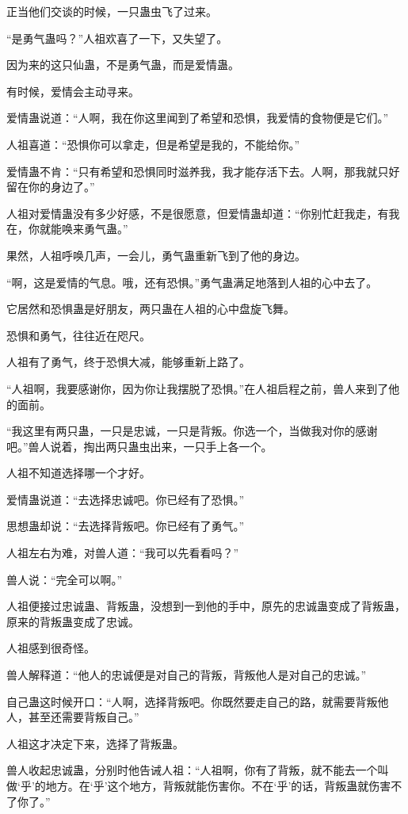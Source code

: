 \begin{this_body}
正当他们交谈的时候，一只蛊虫飞了过来。

“是勇气蛊吗？”人祖欢喜了一下，又失望了。

因为来的这只仙蛊，不是勇气蛊，而是爱情蛊。

有时候，爱情会主动寻来。

爱情蛊说道：“人啊，我在你这里闻到了希望和恐惧，我爱情的食物便是它们。”

人祖喜道：“恐惧你可以拿走，但是希望是我的，不能给你。”

爱情蛊不肯：“只有希望和恐惧同时滋养我，我才能存活下去。人啊，那我就只好留在你的身边了。”

人祖对爱情蛊没有多少好感，不是很愿意，但爱情蛊却道：“你别忙赶我走，有我在，你就能唤来勇气蛊。”

果然，人祖呼唤几声，一会儿，勇气蛊重新飞到了他的身边。

“啊，这是爱情的气息。哦，还有恐惧。”勇气蛊满足地落到人祖的心中去了。

它居然和恐惧蛊是好朋友，两只蛊在人祖的心中盘旋飞舞。

恐惧和勇气，往往近在咫尺。

人祖有了勇气，终于恐惧大减，能够重新上路了。

“人祖啊，我要感谢你，因为你让我摆脱了恐惧。”在人祖启程之前，兽人来到了他的面前。

“我这里有两只蛊，一只是忠诚，一只是背叛。你选一个，当做我对你的感谢吧。”兽人说着，掏出两只蛊虫出来，一只手上各一个。

人祖不知道选择哪一个才好。

爱情蛊说道：“去选择忠诚吧。你已经有了恐惧。”

思想蛊却说：“去选择背叛吧。你已经有了勇气。”

人祖左右为难，对兽人道：“我可以先看看吗？”

兽人说：“完全可以啊。”

人祖便接过忠诚蛊、背叛蛊，没想到一到他的手中，原先的忠诚蛊变成了背叛蛊，原来的背叛蛊变成了忠诚。

人祖感到很奇怪。

兽人解释道：“他人的忠诚便是对自己的背叛，背叛他人是对自己的忠诚。”

自己蛊这时候开口：“人啊，选择背叛吧。你既然要走自己的路，就需要背叛他人，甚至还需要背叛自己。”

人祖这才决定下来，选择了背叛蛊。

兽人收起忠诚蛊，分别时他告诫人祖：“人祖啊，你有了背叛，就不能去一个叫做‘乎’的地方。在‘乎’这个地方，背叛就能伤害你。不在‘乎’的话，背叛蛊就伤害不了你了。”


\end{this_body}
